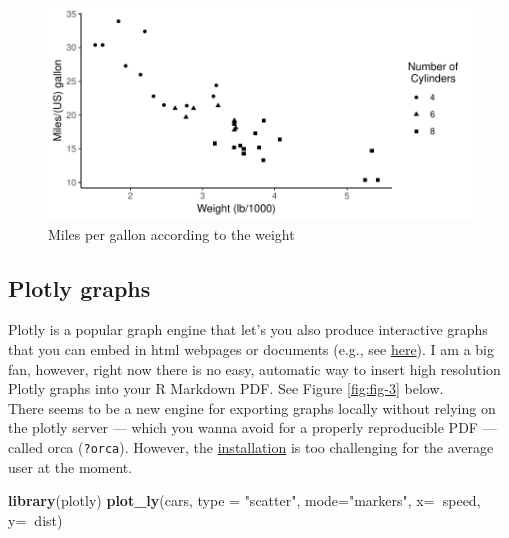 \documentclass[12pt,]{article}
\newenvironment{Shaded}{\begin{snugshade}}{\end{snugshade}}
\newcommand{\KeywordTok}[1]{\textcolor[rgb]{0.13,0.29,0.53}{\textbf{#1}}}
\newcommand{\DataTypeTok}[1]{\textcolor[rgb]{0.13,0.29,0.53}{#1}}
\newcommand{\StringTok}[1]{\textcolor[rgb]{0.31,0.60,0.02}{#1}}
\newcommand{\OperatorTok}[1]{\textcolor[rgb]{0.81,0.36,0.00}{\textbf{#1}}}
\newcommand{\NormalTok}[1]{#1}
\theoremstyle{definition}
\theoremstyle{definition}
\theoremstyle{definition}
\theoremstyle{remark}
\begin{document}
\begin{figure}[H]

{\centering \includegraphics{paper_files/figure-latex/fig-2-1} 

}

\caption{Miles per gallon according to the weight}\label{fig:fig-2}
\end{figure}

\subsection{Plotly graphs}\label{plotly-graphs}

Plotly is a popular graph engine that let's you also produce interactive
graphs that you can embed in html webpages or documents (e.g., see
\href{https://paulcbauer.shinyapps.io/visualizing-causal-scenarios/}{here}).
I am a big fan, however, right now there is no easy, automatic way to
insert high resolution Plotly graphs into your R Markdown PDF. See
Figure \ref{fig:fig-3} below.\\
There seems to be a new engine for exporting graphs locally without
relying on the plotly server --- which you wanna avoid for a properly
reproducible PDF --- called orca (\texttt{?orca}). However, the
\href{https://github.com/plotly/orca\#installation}{installation} is too
challenging for the average user at the moment.

\begin{Shaded}
\begin{Highlighting}[]
\KeywordTok{library}\NormalTok{(plotly)}
\KeywordTok{plot_ly}\NormalTok{(cars, }\DataTypeTok{type =} \StringTok{"scatter"}\NormalTok{, }\DataTypeTok{mode=}\StringTok{"markers"}\NormalTok{,}
        \DataTypeTok{x=}\OperatorTok{~}\NormalTok{speed, }
        \DataTypeTok{y=}\OperatorTok{~}\NormalTok{dist)}
\end{Highlighting}
\end{Shaded}
\end{document}
